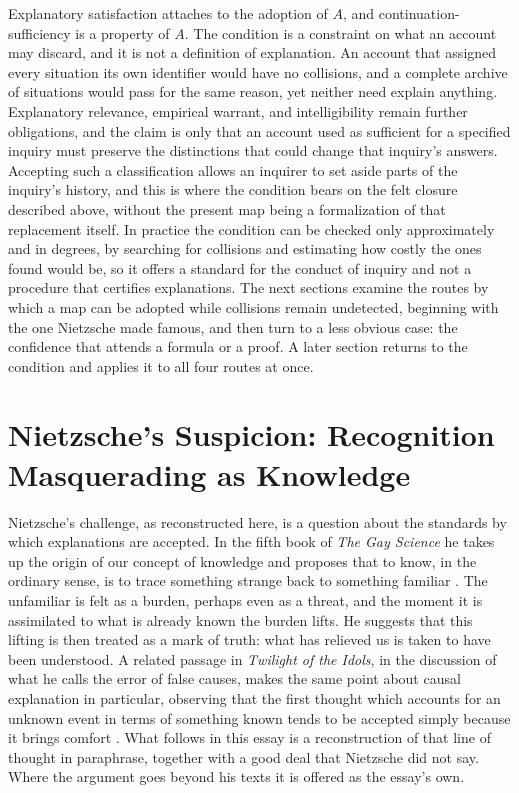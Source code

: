 \documentclass[11pt,letterpaper]{article}
\theoremstyle{definition}
\begin{document}
Explanatory satisfaction attaches to the adoption of $A$, and continuation-sufficiency is a property of $A$. The condition is a constraint on what an account may discard, and it is not a definition of explanation. An account that assigned every situation its own identifier would have no collisions, and a complete archive of situations would pass for the same reason, yet neither need explain anything. Explanatory relevance, empirical warrant, and intelligibility remain further obligations, and the claim is only that an account used as sufficient for a specified inquiry must preserve the distinctions that could change that inquiry's answers. Accepting such a classification allows an inquirer to set aside parts of the inquiry's history, and this is where the condition bears on the felt closure described above, without the present map being a formalization of that replacement itself. In practice the condition can be checked only approximately and in degrees, by searching for collisions and estimating how costly the ones found would be, so it offers a standard for the conduct of inquiry and not a procedure that certifies explanations. The next sections examine the routes by which a map can be adopted while collisions remain undetected, beginning with the one Nietzsche made famous, and then turn to a less obvious case: the confidence that attends a formula or a proof. A later section returns to the condition and applies it to all four routes at once.

\section{Nietzsche's Suspicion: Recognition Masquerading as Knowledge}

Nietzsche's challenge, as reconstructed here, is a question about the standards by which explanations are accepted. In the fifth book of \emph{The Gay Science} he takes up the origin of our concept of knowledge and proposes that to know, in the ordinary sense, is to trace something strange back to something familiar \cite{nietzsche-gs}. The unfamiliar is felt as a burden, perhaps even as a threat, and the moment it is assimilated to what is already known the burden lifts. He suggests that this lifting is then treated as a mark of truth: what has relieved us is taken to have been understood. A related passage in \emph{Twilight of the Idols}, in the discussion of what he calls the error of false causes, makes the same point about causal explanation in particular, observing that the first thought which accounts for an unknown event in terms of something known tends to be accepted simply because it brings comfort \cite{nietzsche-ti}. What follows in this essay is a reconstruction of that line of thought in paraphrase, together with a good deal that Nietzsche did not say. Where the argument goes beyond his texts it is offered as the essay's own.
\end{document}
